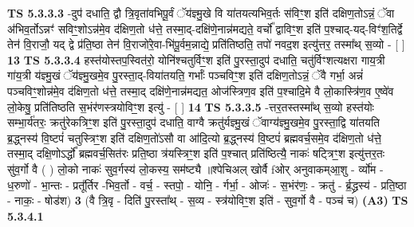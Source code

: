 \documentclass[17pt]{extarticle}
\begin{document}
                  \newline
                                \textbf{ TS 5.3.3.3} \newline
                  -दुप॑ दधाति॒ द्वौ त्रि॒वृता॑वभिपू॒र्वं ॅय॑ज्ञ्मु॒खे वि या॑तयत्यभिव॒र्तः स॑विꣳ॒॒श इति॑ दक्षिण॒तोऽन्नं॒ ॅवा अ॑भिव॒र्तोऽन्नꣳ॑ सविꣳ॒॒शोऽन्न॑मे॒व द॑क्षिण॒तो ध॑त्ते॒ तस्मा॒द्-दक्षि॑णे॒नान्न॑मद्यते॒ वर्चो᳚ द्वाविꣳ॒॒श इति॑ प॒श्चाद्-यद्-विꣳ॑श॒तिर्द्वे तेन॑ वि॒राजौ॒ यद् द्वे प्र॑ति॒ष्ठा तेन॑ वि॒राजो॑रे॒वा-भि॑पू॒र्वम॒न्नाद्ये॒ प्रति॑तिष्ठति॒ तपो॑ नवद॒श इत्यु॑त्तर॒ तस्मा᳚थ् स॒व्यो - [  ] \textbf{  13} \newline
                  \newline
                                \textbf{ TS 5.3.3.4} \newline
                  हस्त॑योस्तप॒स्वित॑रो॒ योनि॑श्चतुर्विꣳ॒॒श इति॑ पु॒रस्ता॒दुप॑ दधाति॒ चतु॑र्विꣳशत्यक्षरा गाय॒त्री गा॑य॒त्री य॑ज्ञ्मु॒खं ॅय॑ज्ञ्मु॒खमे॒व पु॒रस्ता॒द्-विया॑तयति॒ गर्भाः᳚ पञ्चविꣳ॒॒श इति॑ दक्षिण॒तोऽन्नं॒ ॅवै गर्भा॒ अन्नं॑ पञ्चविꣳ॒॒शोन्न॑मे॒व द॑क्षिण॒तो ध॑त्ते॒ तस्मा॒द् दक्षि॑णे॒नान्न॑मद्यत॒ ओज॑स्त्रिण॒व इति॑ प॒श्चादि॒मे वै लो॒कास्त्रि॑ण॒व ए॒ष्वे॑व लो॒केषु॒ प्रति॑तिष्ठति स॒भंर॑णस्त्रयोविꣳ॒॒श इत्यु॑ - [  ] \textbf{  14} \newline
                  \newline
                                \textbf{ TS 5.3.3.5} \newline
                  -त्तर॒तस्तस्मा᳚थ् स॒व्यो हस्त॑योः सम्भा॒र्य॑तरः॒ क्रतु॑रेकत्रिꣳ॒॒श इति॑ पु॒रस्ता॒दुप॑ दधाति॒ वाग्वै क्रतु॑र्यज्ञ्मु॒खं ॅवाग्य॑ज्ञ्मु॒खमे॒व पु॒रस्ता॒द्वि या॑तयति ब्र॒द्ध्नस्य॑ वि॒ष्टपं॑ चतुस्त्रिꣳ॒॒श इति॑ दक्षिण॒तो॑ऽसौ वा आ॑दि॒त्यो ब्र॒द्ध्नस्य॑ वि॒ष्टपं॑ ब्रह्मवर्च॒समे॒व द॑क्षिण॒तो ध॑त्ते॒ तस्मा॒द् दक्षि॒णोऽर्द्धो᳚ ब्रह्मवर्च॒सित॑रः प्रति॒ष्ठा त्र॑यस्त्रिꣳ॒॒श इति॑ प॒श्चात् प्रति॑ष्ठित्यै॒ नाकः॑ षट्त्रिꣳ॒॒श इत्यु॑त्तर॒तः सु॑व॒र्गो वै ( ) लो॒को नाकः॑ सुव॒र्गस्य॑ लो॒कस्य॒ सम॑ष्ट्यै ॥श्पेचिअल् खोर्वै fओर् अनुवाकम्आ॒शु - र्व्यो॑म - ध॒रुणो॑ - भा॒न्तः - प्रतू᳚र्तिर -भिव॒र्तो - वर्च॒ - स्तपो॒ - योनि॒ - र्गर्भा॒ - ओजः॑ - स॒भंर॑णः॒ - क्रतु॑ - र्ब्र॒द्ध्रस्य॑ - प्रति॒ष्ठा - नाकः॒ - षोड॑श) \textbf{  3} \newline
                  \newline
                      (वै त्रि॒वृ - दिति॑ पु॒रस्ता᳚थ् - स॒व्य - स्त्र॑योविꣳ॒॒श इति॑ - सुव॒र्गो वै - पञ्च॑ च)  \textbf{(A3)} \newline \newline
                                        \textbf{ TS 5.3.4.1} \newline
\end{document}
